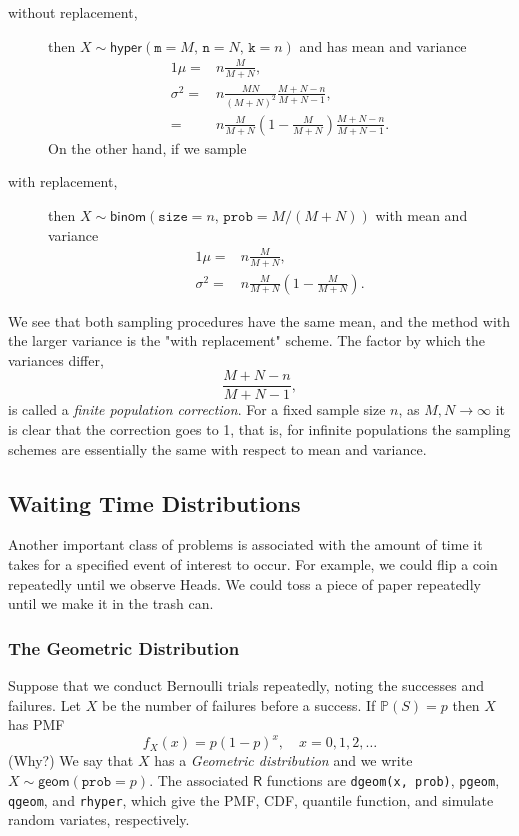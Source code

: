 \begin{description}
\item[{without replacement,}] then
\(X\sim\mathsf{hyper}(\mathtt{m=}M,\,\mathtt{n}=N,\,\mathtt{k}=n)\)
and has mean and variance
\begin{alignat*}{1}
\mu= & n\frac{M}{M+N},\\
\sigma^{2}= & n\frac{MN}{(M+N)^{2}}\frac{M+N-n}{M+N-1},\\
= & n\frac{M}{M+N}\left(1-\frac{M}{M+N}\right)\frac{M+N-n}{M+N-1}.
\end{alignat*}
On the other hand, if we sample
\item[{with replacement,}] then
\(X\sim\mathsf{binom}(\mathtt{size}=n,\,\mathtt{prob}=M/(M+N))\)
with mean and variance
\begin{alignat*}{1}
\mu= & n\frac{M}{M+N},\\
\sigma^{2}= & n\frac{M}{M+N}\left(1-\frac{M}{M+N}\right).
\end{alignat*}
\end{description}

We see that both sampling procedures have the same mean, and the
method with the larger variance is the "with replacement"
scheme. The factor by which the variances differ,
\begin{equation}
\frac{M+N-n}{M+N-1},
\end{equation}
is called a \emph{finite population correction}. For a fixed sample size
\(n\), as \(M,N\to\infty\) it is clear that the correction goes to 1,
that is, for infinite populations the sampling schemes are essentially
the same with respect to mean and variance.

\subsection{Waiting Time Distributions}
\label{sec-5-6-2}

Another important class of problems is associated with the amount of
time it takes for a specified event of interest to occur. For example,
we could flip a coin repeatedly until we observe Heads. We could toss
a piece of paper repeatedly until we make it in the trash can.

\subsubsection{The Geometric Distribution}
\label{sec-5-6-2-1}

Suppose that we conduct Bernoulli trials repeatedly, noting the
successes and failures. Let \(X\) be the number of failures before a
success. If \(\mathbb{P}(S)=p\) then \(X\) has PMF
\begin{equation}
f_{X}(x)=p(1-p)^{x},\quad x=0,1,2,\ldots
\end{equation}
(Why?) We say that \(X\) has a \emph{Geometric distribution} and we write
\(X\sim\mathsf{geom}(\mathtt{prob}=p)\). The associated \(\mathsf{R}\)
functions are \texttt{dgeom(x, prob)}, \texttt{pgeom}, \texttt{qgeom}, and \texttt{rhyper}, which
give the PMF, CDF, quantile function, and simulate random variates,
respectively.

